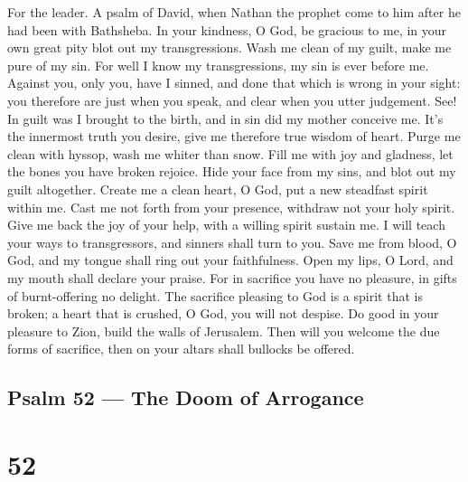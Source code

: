For the leader. A psalm of David, when Nathan the prophet come to him
after he had been with Bathsheba.  In your kindness, O God,
be gracious to me, in your own great pity blot out my transgressions.
 Wash me clean of my guilt, make me pure of my sin.
 For well I know my transgressions, my sin is ever before
me.  Against you, only you, have I sinned, and done that
which is wrong in your sight: you therefore are just when you speak, and
clear when you utter judgement.  See! In guilt was I brought
to the birth, and in sin did my mother conceive me.  It's
the innermost truth you desire, give me therefore true wisdom of heart.
 Purge me clean with hyssop, wash me whiter than snow.
 Fill me with joy and gladness, let the bones you have
broken rejoice.  Hide your face from my sins, and blot out
my guilt altogether.  Create me a clean heart, O God, put a
new steadfast spirit within me.  Cast me not forth from
your presence, withdraw not your holy spirit.  Give me back
the joy of your help, with a willing spirit sustain me.  I
will teach your ways to transgressors, and sinners shall turn to you.
 Save me from blood, O God, and my tongue shall ring out
your faithfulness.  Open my lips, O Lord, and my mouth
shall declare your praise.  For in sacrifice you have no
pleasure, in gifts of burnt-offering no delight.  The
sacrifice pleasing to God is a spirit that is broken; a heart that is
crushed, O God, you will not despise.  Do good in your
pleasure to Zion, build the walls of Jerusalem.  Then will
you welcome the due forms of sacrifice, then on your altars shall
bullocks be offered.

\hypertarget{psalm-52-the-doom-of-arrogance}{%
\subsection{Psalm 52 --- The Doom of
Arrogance}\label{psalm-52-the-doom-of-arrogance}}

\hypertarget{section-51}{%
\section{52}\label{section-51}}

